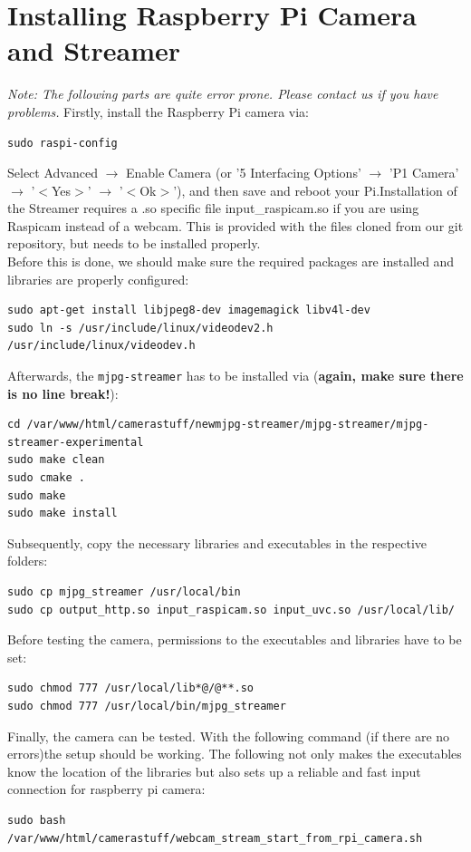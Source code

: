 \section{Installing Raspberry Pi Camera and Streamer}
\textit{Note: The following parts are quite error prone. Please contact us if you have problems.}
Firstly, install the Raspberry Pi camera via:
\begin{lstlisting}
sudo raspi-config
\end{lstlisting}
Select Advanced $\rightarrow$ Enable Camera (or '5 Interfacing Options' $\rightarrow$ 'P1 Camera' $\rightarrow$ '$<$Yes$>$' $\rightarrow$ '$<$Ok$>$'), and then save and reboot your Pi.Installation of the Streamer requires a .so specific file input\_raspicam.so if you are using Raspicam instead of a webcam. This is provided with the files cloned from our git repository, but needs to be installed properly.\\
Before this is done, we should make sure the required packages are installed and libraries are properly configured:
\begin{lstlisting}
sudo apt-get install libjpeg8-dev imagemagick libv4l-dev
sudo ln -s /usr/include/linux/videodev2.h /usr/include/linux/videodev.h
\end{lstlisting}
Afterwards, the \texttt{mjpg-streamer} has to be installed via (\textbf{again, make sure there is no line break!}):
\begin{lstlisting}
cd /var/www/html/camerastuff/newmjpg-streamer/mjpg-streamer/mjpg-streamer-experimental
sudo make clean
sudo cmake .
sudo make
sudo make install
\end{lstlisting}
Subsequently, copy the necessary libraries and executables in the respective folders:
\begin{lstlisting}
sudo cp mjpg_streamer /usr/local/bin
sudo cp output_http.so input_raspicam.so input_uvc.so /usr/local/lib/
\end{lstlisting}
Before testing the camera,  permissions to the executables and libraries have to be set:
\begin{lstlisting}
sudo chmod 777 /usr/local/lib*@/@**.so
sudo chmod 777 /usr/local/bin/mjpg_streamer
\end{lstlisting}
Finally, the camera can be tested. With the following command (if there are no errors)the setup should be working. The following not only makes the executables know the location of the libraries but also sets up a reliable and fast input connection for raspberry pi camera:
\begin{lstlisting}
sudo bash /var/www/html/camerastuff/webcam_stream_start_from_rpi_camera.sh
\end{lstlisting}
